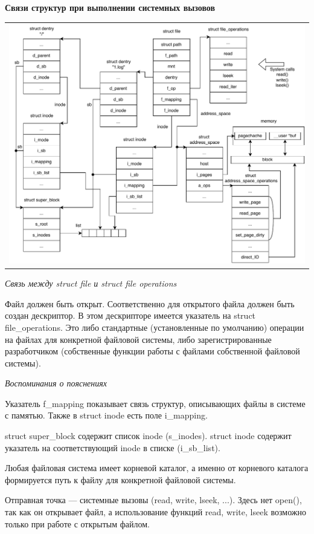 \textbf{Связи структур при выполнении системных вызовов}
\begin{table}[h!]
  \centering
  \begin{tabular}{p{1\linewidth}}
    \centering
    \includegraphics[width=0.8\linewidth]{./images/systemcalls_connect.pdf}
  \end{tabular}
\end{table}

\newpage

\textit{Связь между struct file и struct file operations}

Файл должен быть открыт. Соответственно для открытого файла должен быть создан дескриптор. В этом дескрипторе имеется указатель на struct file\_operations. Это либо стандартные (установленные по умолчанию) операции на файлах для конкретной файловой системы, либо зарегистрированные разработчиком (собственные функции работы с файлами собственной файловой системы).

\textit{Воспоминания о пояснениях}

Указатель f\_mapping показывает связь структур, описывающих файлы в системе с памятью. Также в struct inode есть поле i\_mapping.

struct super\_block содержит список inode (s\_inodes). struct inode содержит указатель на соответствующий inode в списке (i\_sb\_list).

Любая файловая система имеет корневой каталог, а именно от корневого каталога формируется путь к файлу для конкретной файловой системы.

Отправная точка — системные вызовы (read, write, lseek, ...). Здесь нет open(), так как он открывает файл, а использование функций read, write, lseek возможно только при работе с открытым файлом.

